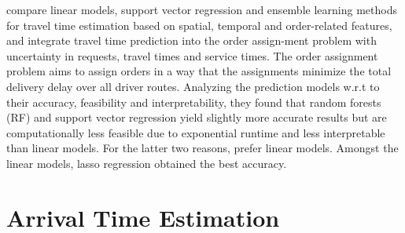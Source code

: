 \citet{Liu2018_LM_PLM} compare linear models, support vector regression and ensemble learning methods for travel time estimation based on spatial, temporal and order-related features, and integrate travel time prediction into the order assign-ment problem with uncertainty in requests, travel times and service times. The order assignment problem aims to assign orders in a way that the assignments minimize the total delivery delay over all driver routes. Analyzing the prediction models w.r.t to their accuracy, feasibility and interpretability, they found that random forests (RF) and support vector regression yield slightly more accurate results but are computationally less feasible due to exponential runtime and less interpretable than linear models. For the latter two reasons, \citet{Liu2018_LM_PLM} prefer linear models. Amongst the linear models, lasso regression obtained the best accuracy.


\section{Arrival Time Estimation}




